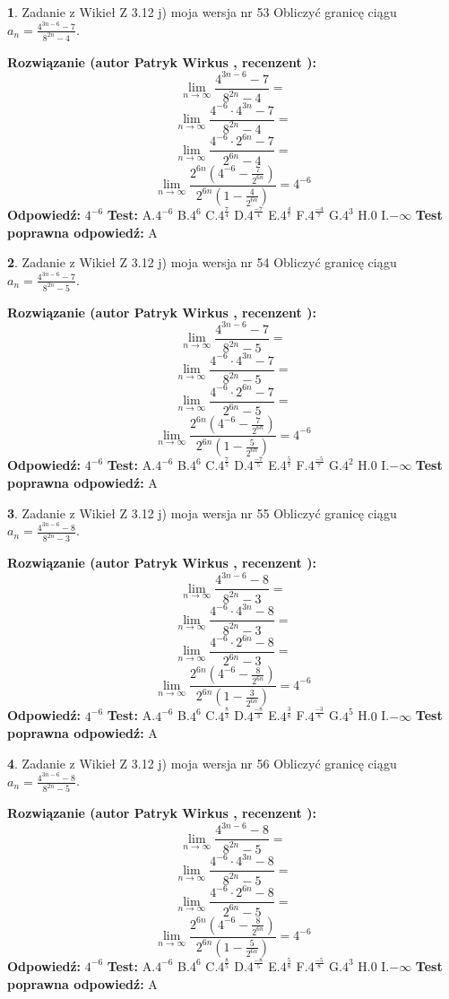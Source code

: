 \documentclass[12pt, a4paper]{article}
\theoremstyle{definition} %
\newtheorem{zad}{}
\newcommand{\zadStart}[1]{\begin{zad}#1\newline}
\newcommand{\zadStop}{\end{zad}}
\newcommand{\rozwStart}[2]{\noindent \textbf{Rozwiązanie (autor #1 , recenzent #2): }\newline}
\newcommand{\rozwStop}{\newline}
\newcommand{\odpStart}{\noindent \textbf{Odpowiedź:}\newline}
\newcommand{\odpStop}{\newline}
\newcommand{\testStart}{\noindent \textbf{Test:}\newline}
\newcommand{\testStop}{\newline}
\newcommand{\kluczStart}{\noindent \textbf{Test poprawna odpowiedź:}\newline}
\newcommand{\kluczStop}{\newline}
\begin{document}
\zadStart{Zadanie z Wikieł Z 3.12 j) moja wersja nr 53}
Obliczyć granicę ciągu $a_{n}=\frac{4^{3n-6}-7}{8^{2n}-4}$.
\zadStop
\rozwStart{Patryk Wirkus}{}
$$\lim\limits_{n\to\infty}\frac{4^{3n-6}-7}{8^{2n}-4}=$$
$$\lim\limits_{n\to\infty}\frac{4^{-6} \cdot 4^{3n}-7}{8^{2n}-4}=$$
$$\lim\limits_{n\to\infty}\frac{4^{-6} \cdot 2^{6n}-7}{2^{6n}-4}=$$
$$\lim\limits_{n\to\infty}\frac{2^{6n}(4^{-6} - \frac{7}{2^{6n}})}{2^{6n}(1-\frac{4}{2^{6n}})}= 4^{-6}$$
\rozwStop
\odpStart
$4^{-6}$
\odpStop
\testStart
A.$4^{-6}$
B.$4^{6}$
C.$4^{\frac{7}{4}}$
D.$4^{\frac{-7}{4}}$
E.$4^{\frac{4}{7}}$
F.$4^{\frac{-4}{7}}$
G.$4^{3}$
H.$0$
I.$-\infty$
\testStop
\kluczStart
A
\kluczStop



\zadStart{Zadanie z Wikieł Z 3.12 j) moja wersja nr 54}
Obliczyć granicę ciągu $a_{n}=\frac{4^{3n-6}-7}{8^{2n}-5}$.
\zadStop
\rozwStart{Patryk Wirkus}{}
$$\lim\limits_{n\to\infty}\frac{4^{3n-6}-7}{8^{2n}-5}=$$
$$\lim\limits_{n\to\infty}\frac{4^{-6} \cdot 4^{3n}-7}{8^{2n}-5}=$$
$$\lim\limits_{n\to\infty}\frac{4^{-6} \cdot 2^{6n}-7}{2^{6n}-5}=$$
$$\lim\limits_{n\to\infty}\frac{2^{6n}(4^{-6} - \frac{7}{2^{6n}})}{2^{6n}(1-\frac{5}{2^{6n}})}= 4^{-6}$$
\rozwStop
\odpStart
$4^{-6}$
\odpStop
\testStart
A.$4^{-6}$
B.$4^{6}$
C.$4^{\frac{7}{5}}$
D.$4^{\frac{-7}{5}}$
E.$4^{\frac{5}{7}}$
F.$4^{\frac{-5}{7}}$
G.$4^{2}$
H.$0$
I.$-\infty$
\testStop
\kluczStart
A
\kluczStop



\zadStart{Zadanie z Wikieł Z 3.12 j) moja wersja nr 55}
Obliczyć granicę ciągu $a_{n}=\frac{4^{3n-6}-8}{8^{2n}-3}$.
\zadStop
\rozwStart{Patryk Wirkus}{}
$$\lim\limits_{n\to\infty}\frac{4^{3n-6}-8}{8^{2n}-3}=$$
$$\lim\limits_{n\to\infty}\frac{4^{-6} \cdot 4^{3n}-8}{8^{2n}-3}=$$
$$\lim\limits_{n\to\infty}\frac{4^{-6} \cdot 2^{6n}-8}{2^{6n}-3}=$$
$$\lim\limits_{n\to\infty}\frac{2^{6n}(4^{-6} - \frac{8}{2^{6n}})}{2^{6n}(1-\frac{3}{2^{6n}})}= 4^{-6}$$
\rozwStop
\odpStart
$4^{-6}$
\odpStop
\testStart
A.$4^{-6}$
B.$4^{6}$
C.$4^{\frac{8}{3}}$
D.$4^{\frac{-8}{3}}$
E.$4^{\frac{3}{8}}$
F.$4^{\frac{-3}{8}}$
G.$4^{5}$
H.$0$
I.$-\infty$
\testStop
\kluczStart
A
\kluczStop



\zadStart{Zadanie z Wikieł Z 3.12 j) moja wersja nr 56}
Obliczyć granicę ciągu $a_{n}=\frac{4^{3n-6}-8}{8^{2n}-5}$.
\zadStop
\rozwStart{Patryk Wirkus}{}
$$\lim\limits_{n\to\infty}\frac{4^{3n-6}-8}{8^{2n}-5}=$$
$$\lim\limits_{n\to\infty}\frac{4^{-6} \cdot 4^{3n}-8}{8^{2n}-5}=$$
$$\lim\limits_{n\to\infty}\frac{4^{-6} \cdot 2^{6n}-8}{2^{6n}-5}=$$
$$\lim\limits_{n\to\infty}\frac{2^{6n}(4^{-6} - \frac{8}{2^{6n}})}{2^{6n}(1-\frac{5}{2^{6n}})}= 4^{-6}$$
\rozwStop
\odpStart
$4^{-6}$
\odpStop
\testStart
A.$4^{-6}$
B.$4^{6}$
C.$4^{\frac{8}{5}}$
D.$4^{\frac{-8}{5}}$
E.$4^{\frac{5}{8}}$
F.$4^{\frac{-5}{8}}$
G.$4^{3}$
H.$0$
I.$-\infty$
\testStop
\kluczStart
A
\kluczStop
\end{document}
